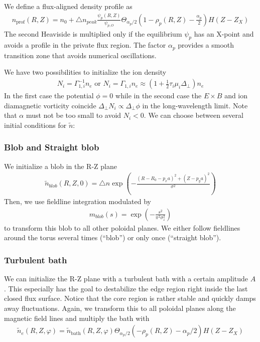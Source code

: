We define a flux-aligned density profile as
\begin{align} \label{eq:density_profile}
  n_{\text{prof}}(R,Z)=
  n_0 + \triangle n_{peak}\frac{\psi_p(R,Z) }{\psi_{p,O}}\Theta_{\alpha_p/2}\left(1-\rho_p(R, Z)-\frac{\alpha_p}{2}\right) H(Z-Z_X)
\end{align}
The second Heaviside is multiplied only if the equilibrium $\psi_p$ has an
X-point and avoids a profile in the private flux region. The factor $\alpha_p$ provides a smooth transition
zone that avoids numerical oscillations.


We have two possibilities to initialize the ion density
\begin{align} \label{eq:initphi}
  N_i = \Gamma_{1,i}^{-1} n_e \text{ or } N_i = \Gamma_{1,i}n_e\approx \left(1+\frac{1}{2}\tau_i\mu_i\Delta_\perp\right)n_e
\end{align}
In the first case the potential $\phi= 0$ while in the second case
the $E\times B$ and ion diamagnetic vorticity coincide $\Delta_\perp N_i \propto \Delta_\perp \phi$ in the long-wavelength limit.
Note that $\alpha$ must not be too small to avoid $N_i < 0$.
We can choose between several initial conditions for $\tilde n$:

\subsubsection{Blob and Straight blob}
We initialize a blob in the R-Z plane
\begin{align} \label{eq:initial_blob}
  \tilde n_{blob}(R,Z,0) = \triangle n \exp\left( -\frac{(R - R_0 - p_x a)^2 + (Z-p_ya)^2}{\sigma^2} \right)
\end{align}
Then, we use fieldline integration modulated by
\begin{align}
  m_{blob}(s) = \exp\left( -\frac{s^2 }{\pi^2\sigma_z^2} \right)
\end{align}
to transform this blob to all other poloidal
planes.
We either follow fieldlines around the torus several times (``blob'') or only once
(``straight blob'').
\subsubsection{Turbulent bath}
We can initialize the R-Z plane with a turbulent bath with a certain amplitude $A$.
This especially has the goal to destabilize the edge region right inside the
last closed flux surface. Notice that the core region is rather stable
and quickly damps away fluctuations.
Again, we transform this to all poloidal planes along the magnetic field lines and multiply the bath with
\begin{align} \label{eq:initial_turbulent}
    \tilde n_e(R,Z,\varphi) = \tilde n_{\text{bath}}(R,Z,\varphi)\Theta_{\alpha_p/2}(-\rho_p(R, Z)-\alpha_p/2) H(Z-Z_X)
\end{align}
